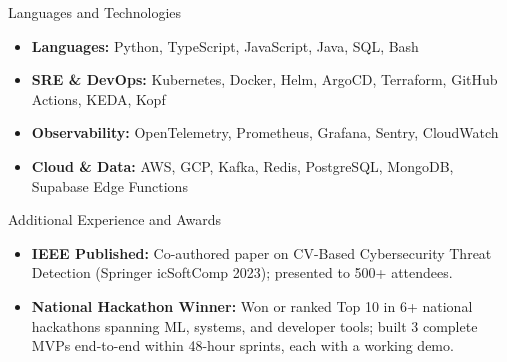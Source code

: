 \documentclass[]{mcdowellcv}
\begin{document}
\begin{cvsection}{Languages and Technologies}
  \begin{cvsubsection}{}{}{}
    \begin{itemize}
      \item \textbf{Languages:} Python, TypeScript, JavaScript, Java, SQL, Bash
      \item \textbf{SRE \& DevOps:} Kubernetes, Docker, Helm, ArgoCD, Terraform, GitHub Actions, KEDA, Kopf
      \item \textbf{Observability:} OpenTelemetry, Prometheus, Grafana, Sentry, CloudWatch
      \item \textbf{Cloud \& Data:} AWS, GCP, Kafka, Redis, PostgreSQL, MongoDB, Supabase Edge Functions
    \end{itemize}
  \end{cvsubsection}
\end{cvsection}

\begin{cvsection}{Additional Experience and Awards}
  \begin{cvsubsection}{}{}{}
    \begin{itemize}
      \item \textbf{IEEE Published:} Co-authored paper on CV-Based Cybersecurity Threat Detection (Springer icSoftComp 2023); presented to 500+ attendees.
      \item \textbf{National Hackathon Winner:} Won or ranked Top 10 in 6+ national hackathons spanning ML, systems, and developer tools; built 3 complete MVPs end-to-end within 48-hour sprints, each with a working demo.
    \end{itemize}
  \end{cvsubsection}
\end{cvsection}
\end{document}
